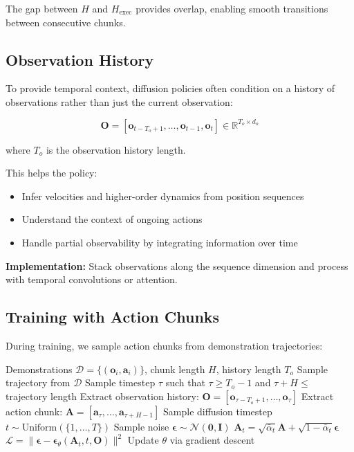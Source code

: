 The gap between $H$ and $H_{\text{exec}}$ provides overlap, enabling smooth transitions between consecutive chunks.

\subsection{Observation History}
\label{subsec:observation_history}

To provide temporal context, diffusion policies often condition on a history of observations rather than just the current observation:

\begin{equation}
\mathbf{O} = [\mathbf{o}_{t-T_o+1}, \ldots, \mathbf{o}_{t-1}, \mathbf{o}_t] \in \mathbb{R}^{T_o \times d_o}
\label{eq:observation_history}
\end{equation}

where $T_o$ is the observation history length.

This helps the policy:
\begin{itemize}
    \item Infer velocities and higher-order dynamics from position sequences
    \item Understand the context of ongoing actions
    \item Handle partial observability by integrating information over time
\end{itemize}

\textbf{Implementation:} Stack observations along the sequence dimension and process with temporal convolutions or attention.

\subsection{Training with Action Chunks}
\label{subsec:training_action_chunks}

During training, we sample action chunks from demonstration trajectories:

\begin{algorithm}[H]
\caption{Diffusion Policy Training with Action Chunks}
\label{alg:diffusion_policy_training}
\begin{algorithmic}[1]
\REQUIRE Demonstrations $\mathcal{D} = \{(\mathbf{o}_i, \mathbf{a}_i)\}$, chunk length $H$, history length $T_o$
\REPEAT
    \STATE Sample trajectory from $\mathcal{D}$
    \STATE Sample timestep $\tau$ such that $\tau \geq T_o - 1$ and $\tau + H \leq$ trajectory length
    \STATE Extract observation history: $\mathbf{O} = [\mathbf{o}_{\tau-T_o+1}, \ldots, \mathbf{o}_\tau]$
    \STATE Extract action chunk: $\mathbf{A} = [\mathbf{a}_\tau, \ldots, \mathbf{a}_{\tau+H-1}]$
    \STATE Sample diffusion timestep $t \sim \text{Uniform}(\{1, \ldots, T\})$
    \STATE Sample noise $\boldsymbol{\epsilon} \sim \mathcal{N}(\mathbf{0}, \mathbf{I})$
    \STATE $\mathbf{A}_t = \sqrt{\bar{\alpha}_t}\mathbf{A} + \sqrt{1-\bar{\alpha}_t}\boldsymbol{\epsilon}$
    \STATE $\mathcal{L} = \|\boldsymbol{\epsilon} - \boldsymbol{\epsilon}_\theta(\mathbf{A}_t, t, \mathbf{O})\|^2$
    \STATE Update $\theta$ via gradient descent
\end{algorithmic}
\end{algorithm}

